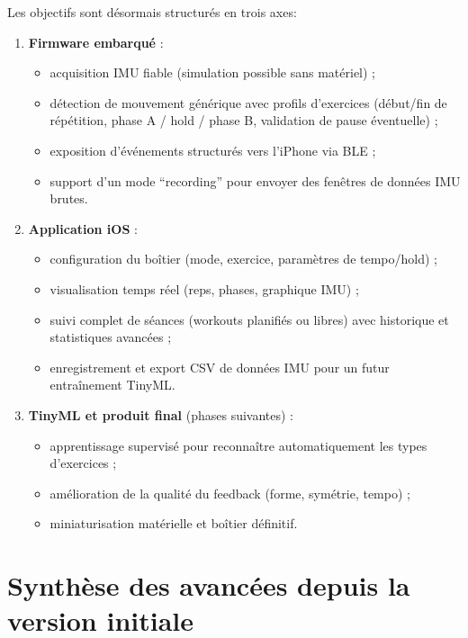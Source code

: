 \documentclass[a4paper,11pt]{article}
\begin{document}
Les objectifs sont désormais structurés en trois axes:
\begin{enumerate}[label=\textbf{\alph*)}]
  \item \textbf{Firmware embarqué} :
  \begin{itemize}
    \item acquisition IMU fiable (simulation possible sans matériel) ;
    \item détection de mouvement générique avec profils d'exercices (début/fin de répétition, phase A / hold / phase B, validation de pause éventuelle) ;
    \item exposition d'événements structurés vers l'iPhone via BLE ;
    \item support d'un mode ``recording'' pour envoyer des fenêtres de données IMU brutes.
  \end{itemize}
  \item \textbf{Application iOS} :
  \begin{itemize}
    \item configuration du boîtier (mode, exercice, paramètres de tempo/hold) ;
    \item visualisation temps réel (reps, phases, graphique IMU) ;
    \item suivi complet de séances (workouts planifiés ou libres) avec historique et statistiques avancées ;
    \item enregistrement et export CSV de données IMU pour un futur entraînement TinyML.
  \end{itemize}
  \item \textbf{TinyML et produit final} (phases suivantes) :
  \begin{itemize}
    \item apprentissage supervisé pour reconnaître automatiquement les types d'exercices ;
    \item amélioration de la qualité du feedback (forme, symétrie, tempo) ;
    \item miniaturisation matérielle et boîtier définitif.
  \end{itemize}
\end{enumerate}

\section{Synthèse des avancées depuis la version initiale}
\end{document}
